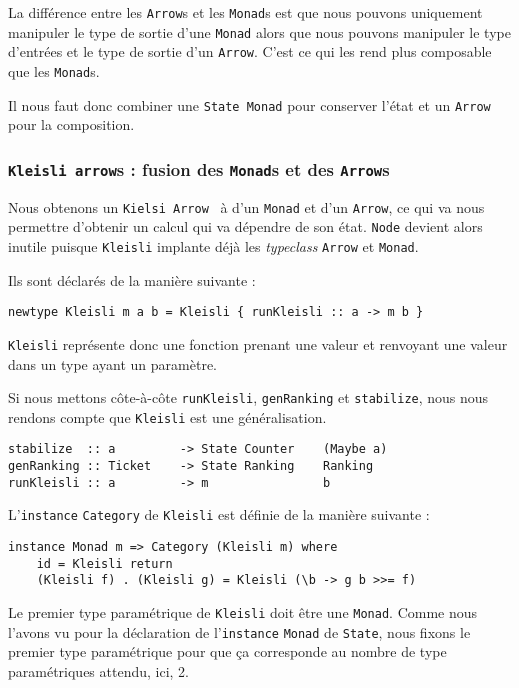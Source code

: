 \documentclass{llncs}
\newcommand{\Arr}{\lstinline{Arrow} }
\newcommand{\Arrp}{\lstinline{Arrow}. }
\newcommand{\Arrs}{\lstinline{Arrow}s }
\newcommand{\Arrv}{\lstinline{Arrow}, }
\begin{document}
La différence entre les \Arrs et les \lstinline{Monad}s est que nous pouvons
uniquement manipuler le type de sortie d'une \lstinline{Monad} alors que nous pouvons
manipuler le type d'entrées et le type de sortie d'un \Arrp
C'est ce qui les rend plus composable que les \lstinline{Monad}s.

Il nous faut donc combiner une \lstinline{State Monad} pour conserver l'état et un
\lstinline{Arrow} pour la composition.

\subsubsection{\lstinline{Kleisli arrow}s : fusion des \lstinline{Monad}s et des \Arrs}
Nous obtenons un \lstinline{Kielsi Arrow}~\cite{Hughes00} à d'un \lstinline{Monad}
et d'un \Arrv ce qui va nous permettre d'obtenir un calcul qui va dépendre de son état.
\lstinline{Node} devient alors inutile puisque \lstinline{Kleisli} implante déjà les
\emph{typeclass} \Arr et \lstinline{Monad}.

Ils sont déclarés de la manière suivante :
\begin{lstlisting}
newtype Kleisli m a b = Kleisli { runKleisli :: a -> m b }
\end{lstlisting}

\lstinline{Kleisli} représente donc une fonction prenant une valeur et renvoyant
une valeur dans un type ayant un paramètre.

Si nous mettons côte-à-côte \lstinline{runKleisli}, \lstinline{genRanking} et
\lstinline{stabilize}, nous nous rendons compte que \lstinline{Kleisli} est une
généralisation.
\begin{lstlisting}
stabilize  :: a         -> State Counter    (Maybe a)
genRanking :: Ticket    -> State Ranking    Ranking
runKleisli :: a         -> m                b
\end{lstlisting}

L'\lstinline{instance} \lstinline{Category} de \lstinline{Kleisli} est
définie de la manière suivante :
\begin{lstlisting}
instance Monad m => Category (Kleisli m) where
    id = Kleisli return
    (Kleisli f) . (Kleisli g) = Kleisli (\b -> g b >>= f)
\end{lstlisting}
Le premier type paramétrique de \lstinline{Kleisli} doit être une \lstinline{Monad}.
Comme nous l'avons vu pour la déclaration de l'\lstinline{instance} \lstinline{Monad}
de \lstinline{State}, nous fixons le premier type paramétrique pour que ça corresponde
au nombre de type paramétriques attendu, ici, 2.
\end{document}
